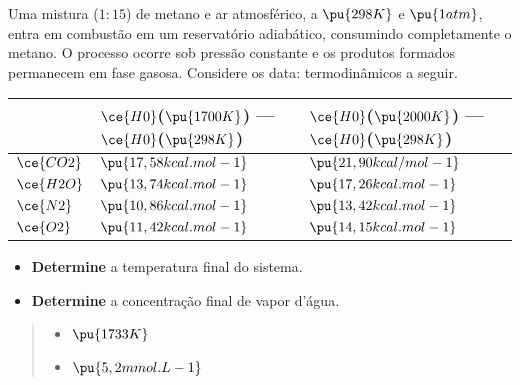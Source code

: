 Uma mistura (\(1:15\)) de metano e ar atmosférico, a \(\pu{298 K}\) e
\(\pu{1 atm}\), entra em combustão em um reservatório adiabático,
consumindo completamente o metano. O processo ocorre sob pressão
constante e os produtos formados permanecem em fase gasosa. Considere os
data: termodinâmicos a seguir.

\begin{longtable}[]{@{}
  >{\raggedright\arraybackslash}p{}
  >{\raggedleft\arraybackslash}p{}
  >{\raggedleft\arraybackslash}p{}@{}}
\toprule
& \(\ce{H0}\)(\(\pu{1700 K}\)) --- \(\ce{H0}\)(\(\pu{298 K}\)) &
\(\ce{H0}\)(\(\pu{2000 K}\)) --- \(\ce{H0}\)(\(\pu{298 K}\)) \\
\midrule
\endhead
\(\ce{CO2}\) & \(\pu{17,58 kcal.mol-1}\) & \(\pu{21,90 kcal/mol-1}\) \\
\(\ce{H2O}\) & \(\pu{13,74 kcal.mol-1}\) & \(\pu{17,26 kcal.mol-1}\) \\
\(\ce{N2}\) & \(\pu{10,86 kcal.mol-1}\) & \(\pu{13,42 kcal.mol-1}\) \\
\(\ce{O2}\) & \(\pu{11,42 kcal.mol-1}\) & \(\pu{14,15 kcal.mol-1}\) \\
\bottomrule
\end{longtable}

\begin{itemize}
\tightlist
\item
  \textbf{Determine} a temperatura final do sistema.
\item
  \textbf{Determine} a concentração final de vapor d'água.
\end{itemize}

\begin{quote}
\begin{itemize}
\tightlist
\item
  \(\pu{1733 K}\)
\item
  \(\pu{5,2 mmol.L-1}\)
\end{itemize}
\end{quote}
